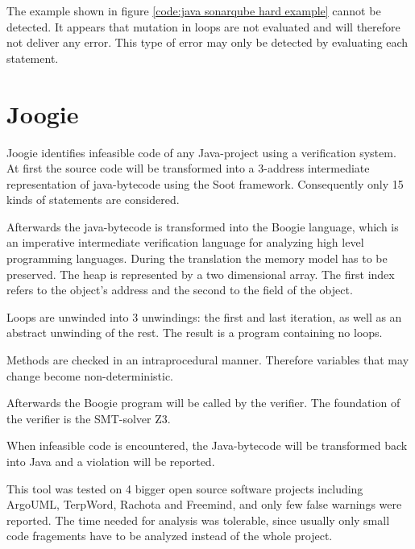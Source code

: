 The example shown in figure \ref{code:java sonarqube hard example} cannot be detected. It appears that mutation in loops are not evaluated and will therefore not deliver any error. This type of error may only be detected by evaluating each statement.

\section{Joogie}
\label{sec:sca paper}

Joogie \cite{arltJoogieInfeasibleCode2012, arltJoogieJavaJimple2013} identifies infeasible code of any Java-project using a verification system. 
At first the source code will be transformed into a 3-address intermediate representation of java-bytecode using the Soot framework. Consequently only 15 kinds of statements are considered. 

Afterwards the java-bytecode is transformed into the Boogie language, which is an imperative intermediate verification language for analyzing high level programming languages.
During the translation the memory model has to be preserved. The heap is represented by a two dimensional array. The first index refers to the object's address and the second to the field of the object.

Loops are unwinded into 3 unwindings: the first and last iteration, as well as an abstract unwinding of the rest.
The result is a program containing no loops.


Methods are checked in an intraprocedural manner. Therefore variables that may change become non-deterministic. 


Afterwards the Boogie program will be called by the verifier. 
The foundation of the verifier is the SMT-solver Z3.



When infeasible code is encountered, the Java-bytecode will be transformed back into Java and a violation will be reported.


This tool was tested on 4 bigger open source software projects including ArgoUML, TerpWord, Rachota and Freemind, and only few false warnings were reported.
The time needed for analysis was tolerable, since usually only small code fragements have to be analyzed instead of the whole project.

